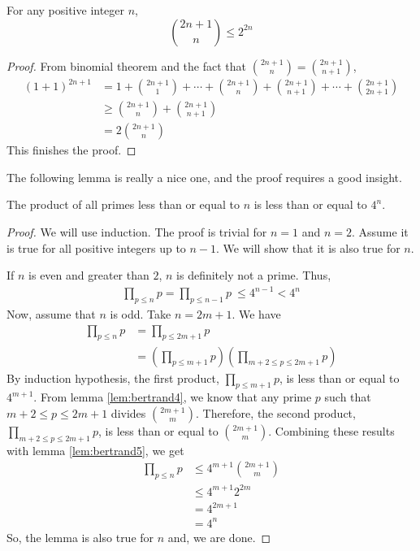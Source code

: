 \documentclass{subfile}
\begin{document}
	\begin{lemma}\label{lem:bertrand5}
		For any positive integer $n$,
		\[\binom{2n+1}{n}\leq2^{2n}\]
	\end{lemma}

	\begin{proof}
		From binomial theorem and the fact that $\binom{2n+1}{n}=\binom{2n+1}{n+1}$,
		\begin{align*}
			(1+1)^{2n+1}
				& = 1+\binom{2n+1}1+\cdots+\binom{2n+1}{n}+\binom{2n+1}{n+1}+\cdots+\binom{2n+1}{2n+1}\\
				& \geq  \binom{2n+1}{n}+\binom{2n+1}{n+1}\\
				& =  2\binom{2n+1}{n}
		\end{align*}
		This finishes the proof.
	\end{proof}

	The following lemma is really a nice one, and the proof requires a good insight.

	\begin{lemma}\label{lem:bertrand6}
		The product of all primes less than or equal to $n$ is less than or equal to $4^n$.
	\end{lemma}

	\begin{proof}
		We will use induction. The proof is trivial for $n=1$ and $n=2$. Assume it is true for all positive integers up to $n-1$. We will show that it is also true for $n$.

		If $n$ is even and greater than $2$, $n$ is definitely not a prime. Thus,
		\begin{align*}
			\prod_{p\leq n}p =  \prod_{p\leq n-1}p\ \leq  4^{n-1}<  4^n
		\end{align*}
		Now, assume that $n$ is odd. Take $n=2m+1$. We have
		\begin{align*}
			\prod_{p\leq n}p
				& =	\prod_{p\leq 2m+1} p\\
				& = \left(\prod_{p\leq m+1}p \right) \left( \prod_{m+2\leq p\leq2m+1}p\right)
		\end{align*}
		By induction hypothesis, the first product, $\prod\limits_{p\leq m+1}p$, is less than or equal to $4^{m+1}$. From lemma \autoref{lem:bertrand4}, we know that any prime $p$ such that $m+2\leq p\leq2m+1$ divides $\binom{2m+1}{m}$. Therefore, the second product, $\prod\limits_{m+2\leq p\leq2m+1}p$, is less than or equal to $\binom{2m+1}{m}$. Combining these results with lemma \autoref{lem:bertrand5}, we get
		\begin{align*}
			\prod_{p\leq n}p
				& \leq 4^{m+1}\binom{2m+1}{m}\\
				& \leq 4^{m+1}2^{2m}\\
				& =  4^{2m+1}\\
				& = 4^n
		\end{align*}
		So, the lemma is also true for $n$ and, we are done.
	\end{proof}
\end{document}
